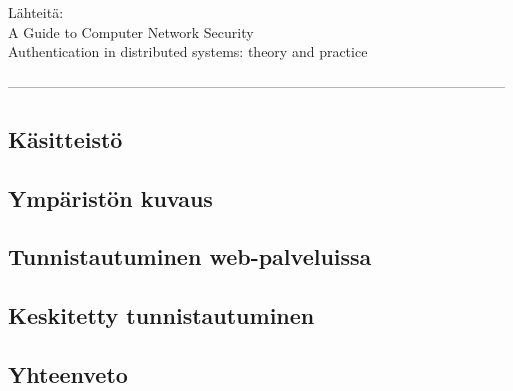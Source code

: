 Lähteitä:\\
A Guide to Computer Network Security \cite{authentication}\\
Authentication in distributed systems: theory and practice \cite{lampson}

-----------------------------------------------------------------------------------------------------------


\subsection{Käsitteistö}

\subsection{Ympäristön kuvaus}

\subsection{Tunnistautuminen web-palveluissa}

\subsection{Keskitetty tunnistautuminen}

\subsection{Yhteenveto}

